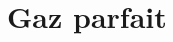 \documentclass[a4paper,DIV16,10pt]{scrartcl}
\begin{document}
 \inidoc

\section{Gaz parfait}

\end{document}
